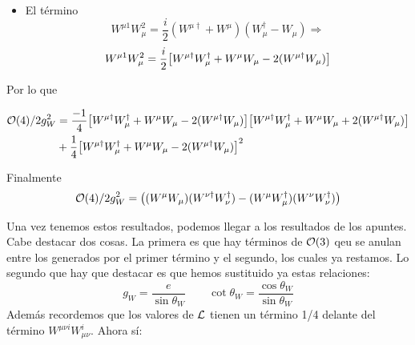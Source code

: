 \begin{itemize}
	\begin{itemize}
		\item El término
		\begin{equation}
			W^{\mu  1} W_{\mu}^2 =  \frac{i}{2} (W^{\mu \dagger} + W^{\mu})(W_{\mu}^{\dagger} - W_{\mu}) \Longrightarrow
  		\end{equation}
		\begin{equation}
			W^{\mu  1} W_{\mu}^2 =  \frac{i}{2} \bqty{W^{\mu \dagger} W_{\mu}^{\dagger} + W^{\mu } W_{\mu} -  2(W^{\mu \dagger} W_{\mu})  }
		\end{equation}
	\end{itemize}
	Por lo que 

	
	\begin{align}
		\Ocal(4) /2g_W^2 & =   \frac{-1}{4} \bqty{W^{\mu \dagger} W_{\mu}^{\dagger} + W^{\mu } W_{\mu} -  2(W^{\mu \dagger} W_{\mu})  }\bqty{W^{\mu \dagger} W_{\mu}^{\dagger} + W^{\mu } W_{\mu} +  2(W^{\mu \dagger} W_{\mu})  }  \nonumber \\
		& +  \frac{1}{4} \bqty{W^{\mu \dagger} W_{\mu}^{\dagger} + W^{\mu } W_{\mu} -  2(W^{\mu \dagger} W_{\mu})  }^2 
	\end{align}

	Finalmente
	\begin{align}
		\Ocal(4) /2g_W^2 = \pqty{ (W^{\mu}W_{\mu})(W^{\nu \dagger} W_\nu^\dagger)-(W^{\mu}W^{\dagger}_{\mu})(W^{\nu} W_\nu^\dagger)}
	\end{align}
\end{itemize}
Una vez tenemos estos resultados, podemos llegar a los resultados de los apuntes. Cabe destacar dos cosas. La primera es que hay términos de $\mathcal{O}(3)$ qeu se anulan entre los generados por el primer término y el segundo, los cuales ya restamos. Lo segundo que hay que destacar es que hemos sustituido ya estas relaciones:
\begin{equation}
	g_W = \frac{e}{\sin \theta_W} \qquad \cot \theta_W = \frac{\cos \theta_W}{\sin \theta_W}
\end{equation}
Además recordemos que los valores de $\mathcal{L}$ tienen un término 1/4 delante del término $W^{\mu \nu i}W_{\mu \nu}^i$. Ahora sí: 


